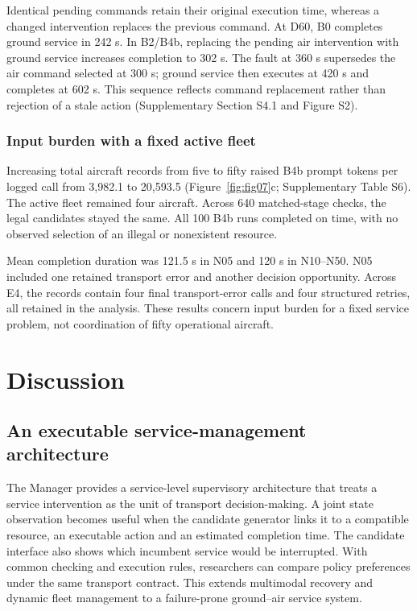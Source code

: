 \documentclass[]{interact}
\theoremstyle{plain}
\theoremstyle{definition}
\theoremstyle{remark}
\begin{document}
Identical pending commands retain their original execution time, whereas a changed intervention replaces the previous command. At D60, B0 completes ground service in 242 s. In B2/B4b, replacing the pending air intervention with ground service increases completion to 302 s. The fault at 360 s supersedes the air command selected at 300 s; ground service then executes at 420 s and completes at 602 s. This sequence reflects command replacement rather than rejection of a stale action (Supplementary Section S4.1 and Figure S2).


\subsubsection{Input burden with a fixed active fleet}

Increasing total aircraft records from five to fifty raised B4b prompt tokens per logged call from 3,982.1 to 20,593.5 (Figure~\ref{fig:fig07}c; Supplementary Table S6). The active fleet remained four aircraft. Across 640 matched-stage checks, the legal candidates stayed the same. All 100 B4b runs completed on time, with no observed selection of an illegal or nonexistent resource.

Mean completion duration was 121.5 s in N05 and 120 s in N10--N50. N05 included one retained transport error and another decision opportunity. Across E4, the records contain four final transport-error calls and four structured retries, all retained in the analysis. These results concern input burden for a fixed service problem, not coordination of fifty operational aircraft.

\FloatBarrier
\section{Discussion}

\subsection{An executable service-management architecture}

The Manager provides a service-level supervisory architecture that treats a service intervention as the unit of transport decision-making. A joint state observation becomes useful when the candidate generator links it to a compatible resource, an executable action and an estimated completion time. The candidate interface also shows which incumbent service would be interrupted. With common checking and execution rules, researchers can compare policy preferences under the same transport contract. This extends multimodal recovery and dynamic fleet management to a failure-prone ground--air service system. \citep{ref4,ref20,ref22}
\end{document}
